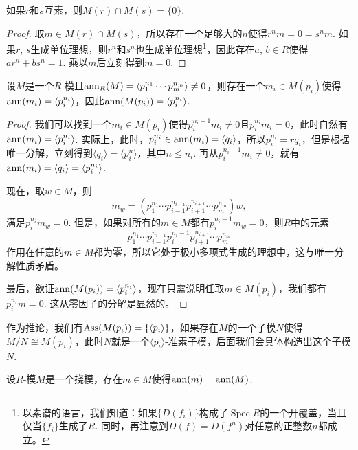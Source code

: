\begin{lem}
    如果$r$和$s$互素，则$M(r)\cap M(s)=\{0\}$.
\end{lem}

\begin{proof}
    取$m\in M(r)\cap M(s)$，所以存在一个足够大的$n$使得$r^nm=0=s^nm$. 如果$r$, $s$生成单位理想，则$r^{n}$和$s^{n}$也生成单位理想\footnote{以素谱的语言，我们知道：如果$\{D(f_i)\}$构成了$\operatorname{Spec} R$的一个开覆盖，当且仅当$\{f_i\}$生成了$R$. 同时，再注意到$D(f)=D(f^n)$对任意的正整数$n$都成立。}，因此存在$a$, $b\in R$使得$ar^{n}+bs^{n}=1$. 乘以$m$后立刻得到$m=0$.
\end{proof}

\begin{lem}
    设$M$是一个$R$-模且$\operatorname{ann}_R(M)=\langle p_1^{n_1}\cdots p_m^{n_m}\rangle \neq 0$，则存在一个$m_i\in M(p_i)$使得$\operatorname{ann}(m_i)=\langle p_i^{n_i}\rangle$，因此$\operatorname{ann}(M(p_i))=\langle p_i^{n_i}\rangle$.
\end{lem}

\begin{proof}
    我们可以找到一个$m_i\in M(p_i)$使得$p_i^{n_i-1}m_i\neq 0$且$p_i^{n_i}m_i=0$，此时自然有$\operatorname{ann}(m_i)=\langle p_i^{n_i}\rangle$. 实际上，此时，$p_i^{n_i}\in \operatorname{ann}(m_i)=\langle q_i\rangle$，所以$p_i^{n_i}=rq_i$，但是根据唯一分解，立刻得到$\langle q_i\rangle=\langle p_i^n\rangle$，其中$n\leq n_i$. 再从$p_i^{n_i-1}m_i\neq 0$，就有$\operatorname{ann}(m_i)=\langle q_i\rangle = \langle p_i^{n_i}\rangle$.
    
    现在，取$w\in M$，则
    \[
        m_w=\left(p_1^{n_1}\cdots p_{i-1}^{n_{i-1}}p_{i+1}^{n_{i+1}}\cdots p_{m}^{n_{m}}\right)w,
    \]
    满足$p_i^{n_i}m_w=0$. 但是，如果对所有的$m\in M$都有$p_i^{n_i-1}m_w=0$，则$R$中的元素
    \[
        p_1^{n_1}\cdots p_{i-1}^{n_{i-1}}p_i^{n_i-1}p_{i+1}^{n_{i+1}}\cdots p_{m}^{n_{m}}
    \]
    作用在任意的$m\in M$都为零，所以它处于极小多项式生成的理想中，这与唯一分解性质矛盾。

    最后，欲证$\operatorname{ann}(M(p_i))=\langle p_i^{n_i}\rangle$，现在只需说明任取$m\in M(p_i)$，我们都有$p_i^{n_i}m=0$. 这从零因子的分解是显然的。
\end{proof}

作为推论，我们有$\operatorname{Ass}(M(p_i))=\{\langle p_i\rangle\}$，如果存在$M$的一个子模$N$使得$M/N\cong M(p_i)$，此时$N$就是一个$\langle p_i\rangle$-准素子模，后面我们会具体构造出这个子模$N$.

\begin{pro}
    设$R$-模$M$是一个挠模，存在$m\in M$使得$\operatorname{ann}(m)=\operatorname{ann}(M)$.
\end{pro}

